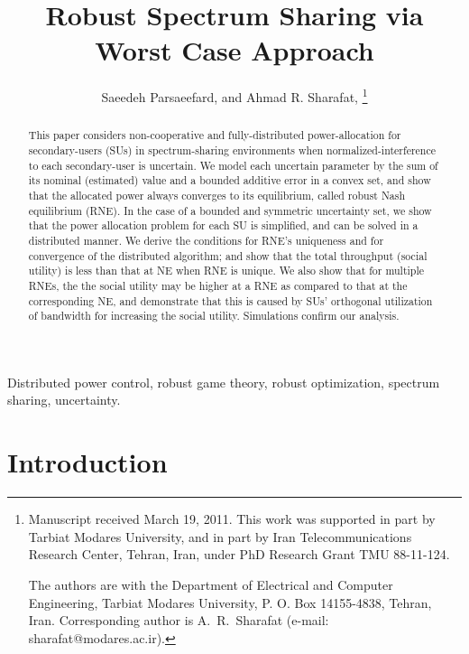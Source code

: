 \documentclass[peerreview,onecolumn,11pt,draftclsnofoot]{IEEEtran}\usepackage{amsmath}\usepackage{amsfonts}\usepackage{epsfig}\usepackage{amssymb}\usepackage{graphicx}\usepackage{amssymb,amsmath}\usepackage{cite}\usepackage{color,soul}\newcommand\T{\rule{0pt}{3.1ex}}
\begin{document}
\title{Robust Spectrum Sharing via Worst Case Approach}

\author{Saeedeh Parsaeefard,  and
        Ahmad R. Sharafat, 
\thanks{Manuscript received March 19, 2011. This work was supported in part by Tarbiat Modares University, and in part by Iran Telecommunications Research Center, Tehran, Iran, under PhD Research Grant TMU 88-11-124.

The authors are with the Department of Electrical and Computer
Engineering, Tarbiat Modares University, P. O. Box 14155-4838,
Tehran, Iran. Corresponding author is A.~R.~Sharafat (e-mail:
sharafat@modares.ac.ir).}}

\maketitle

\begin{abstract}
This paper considers non-cooperative and fully-distributed power-allocation for secondary-users (SUs) in spectrum-sharing environments when normalized-interference to each secondary-user is uncertain. We model each uncertain parameter by the sum of its nominal (estimated) value and a bounded additive error in a convex set, and show that the allocated power always converges to its equilibrium, called robust Nash equilibrium (RNE). In the case of a bounded and symmetric uncertainty set, we show that the power allocation problem for each SU is simplified, and can be solved in a distributed manner. We derive the conditions for RNE's uniqueness and for convergence of the distributed algorithm; and show that the total throughput (social utility) is less than that at NE when RNE is unique. We also show that for multiple RNEs, the the social utility may be higher at a RNE as compared to that at the corresponding NE, and demonstrate that this is caused by SUs' orthogonal utilization of bandwidth for increasing the social utility. Simulations confirm our analysis.


\end{abstract}

\begin{IEEEkeywords}
Distributed power control, robust game theory, robust optimization, spectrum sharing, uncertainty.
\end{IEEEkeywords}
\section{Introduction}
\end{document}
